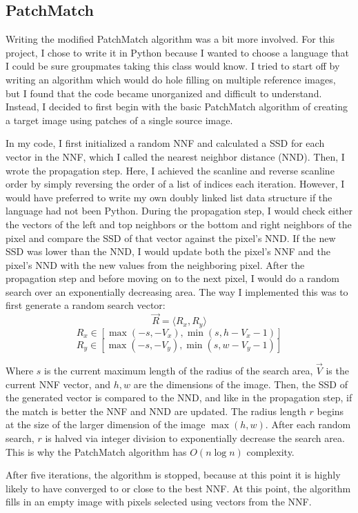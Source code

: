 \subsection*{PatchMatch}
Writing the modified PatchMatch algorithm was a bit more involved. For this project, I chose to write it in Python because I wanted to choose a language that I could be sure groupmates taking this class would know. I tried to start off by writing an algorithm which would do hole filling on multiple reference images, but I found that the code became unorganized and difficult to understand. Instead, I decided to first begin with the basic PatchMatch algorithm of creating a target image using patches of a single source image.

In my code, I first initialized a random NNF and calculated a SSD for each vector in the NNF, which I called the nearest neighbor distance (NND). Then, I wrote the propagation step. Here, I achieved the scanline and reverse scanline order by simply reversing the order of a list of indices each iteration. However, I would have preferred to write my own doubly linked list data structure if the language had not been Python. During the propagation step, I would check either the vectors of the left and top neighbors or the bottom and right neighbors of the pixel and compare the SSD of that vector against the pixel's NND. If the new SSD was lower than the NND, I would update both the pixel's NNF and the pixel's NND with the new values from the neighboring pixel. After the propagation step and before moving on to the next pixel, I would do a random search over an exponentially decreasing area. The way I implemented this was to first generate a random search vector: 
$$\vec{R} = \langle R_x, R_y \rangle$$
$$R_x \in [\max(-s, -V_x), \min(s, h-V_x-1)]$$
$$R_y \in [\max(-s, -V_y), \min(s, w-V_y-1)]$$

Where $s$ is the current maximum length of the radius of the search area, $\vec V$ is the current NNF vector, and $h,w$ are the dimensions of the image. Then, the SSD of the generated vector is compared to the NND, and like in the propagation step, if the match is better the NNF and NND are updated. The radius length $r$ begins at the size of the larger dimension of the image $\max(h,w)$. After each random search, $r$ is halved via integer division to exponentially decrease the search area. This is why the PatchMatch algorithm has $O(n\log n)$ complexity.

After five iterations, the algorithm is stopped, because at this point it is highly likely to have converged to or close to the best NNF. At this point, the algorithm fills in an empty image with pixels selected using vectors from the NNF.

